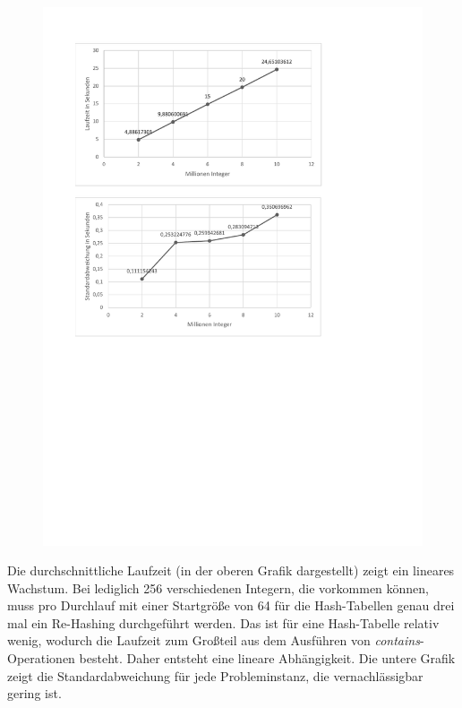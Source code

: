 \begin{figure}[H]
	\hspace*{-1.7cm}\includegraphics[width=1.5\linewidth]{Bilder/benchmark_2M.pdf}
\end{figure}
\newpage
Die durchschnittliche Laufzeit (in der oberen Grafik dargestellt) zeigt ein lineares Wachstum. Bei lediglich 256 verschiedenen Integern, die vorkommen können, muss pro Durchlauf mit einer Startgröße von 64 für die Hash-Tabellen genau drei mal ein Re-Hashing durchgeführt werden. Das ist für eine Hash-Tabelle relativ wenig, wodurch die Laufzeit zum Großteil aus dem Ausführen von \textit{contains}-Operationen besteht. Daher entsteht eine lineare Abhängigkeit. Die untere Grafik zeigt die Standardabweichung für jede Probleminstanz, die vernachlässigbar gering ist.

